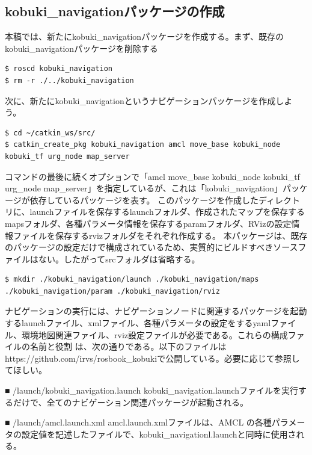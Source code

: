 \subsection{kobuki\_navigationパッケージの作成}

本稿では、新たにkobuki\_navigationパッケージを作成する。まず、既存のkobuki\_navigationパッケージを削除する

\begin{lstlisting}[language=ROS]
$ roscd kobuki_navigation
$ rm -r ./../kobuki_navigation
\end{lstlisting}

次に、新たにkobuki\_navigationというナビゲーションパッケージを作成しよう。

\begin{lstlisting}[language=ROS]
$ cd ~/catkin_ws/src/
$ catkin_create_pkg kobuki_navigation amcl move_base kobuki_node kobuki_tf urg_node map_server
\end{lstlisting}

コマンドの最後に続くオプションで「amcl move\_base kobuki\_node kobuki\_tf urg\_node map\_server」を指定しているが、これは「kobuki\_navigation」パッケージが依存しているパッケージを表す。
このパッケージを作成したディレクトリに、launchファイルを保存するlaunchフォルダ、作成されたマップを保存するmapsフォルダ、各種パラメータ情報を保存するparamフォルダ、RVizの設定情報ファイルを保存するrvizフォルダをそれぞれ作成する。  本パッケージは、既存のパッケージの設定だけで構成されているため、実質的にビルドすべきソースファイルはない。したがってsrcフォルダは省略する。

\begin{lstlisting}[language=ROS]
$ mkdir ./kobuki_navigation/launch ./kobuki_navigation/maps ./kobuki_navigation/param ./kobuki_navigation/rviz
\end{lstlisting}

ナビゲーションの実行には、ナビゲーションノードに関連するパッケージを起動するlaunchファイル、xmlファイル、各種パラメータの設定をするyamlファイル、環境地図関連ファイル、rviz設定ファイルが必要である。これらの構成ファイルの名前と役割 は、次の通りである。以下のファイルはhttps://github.com/irvs/rosbook\_kobukiで公開している。必要に応じて参照してほしい。

■ /launch/kobuki\_navigation.launch
kobuki\_navigation.launchファイルを実行するだけで、全てのナビゲーション関連パッケージが起動される。

■ /launch/amcl.launch.xml
amcl.launch.xmlファイルは、AMCL の各種パラメータの設定値を記述したファイルで、kobuki\_navigationl.launchと同時に使用される。

